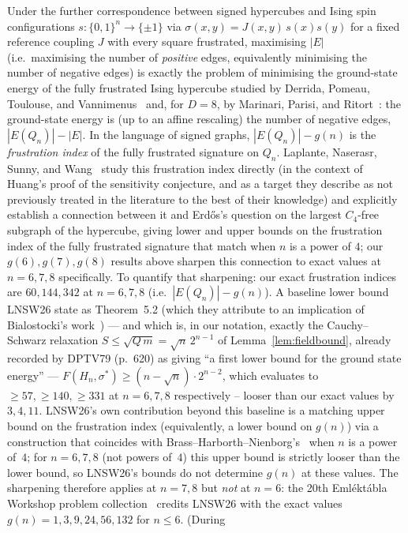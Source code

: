 \documentclass[12pt,a4paper]{article}
\theoremstyle{definition}
\begin{document}
Under the further correspondence between signed
hypercubes and Ising spin configurations $s:\{0,1\}^n\to\{\pm1\}$ via
$\sigma(x,y)=J(x,y)\,s(x)s(y)$ for a fixed reference coupling $J$ with every
square frustrated, maximising $|E|$ (i.e.\ maximising the number of
\emph{positive} edges, equivalently minimising the number of negative
edges) is exactly the problem of minimising the ground-state energy of the
fully frustrated Ising hypercube studied by Derrida, Pomeau, Toulouse, and
Vannimenus~\cite{DPTV79} and, for $D=8$, by Marinari, Parisi, and
Ritort~\cite{MPR95}: the ground-state energy is (up to an affine rescaling)
the number of negative edges, $|E(Q_n)|-|E|$. In the language of signed
graphs, $|E(Q_n)|-g(n)$ is the \emph{frustration index} of the fully
frustrated signature on $Q_n$. Laplante, Naserasr, Sunny, and
Wang~\cite{LNSW26} study this frustration index directly (in the
context of Huang's proof of the sensitivity conjecture, and as a target they
describe as not previously treated in the literature to the best of their
knowledge) and explicitly
establish a connection between it and Erd\H{o}s's question on the
largest $C_4$-free subgraph of the hypercube, giving lower and upper
bounds on the frustration index of the fully frustrated signature that
match when $n$ is a power of $4$; our $g(6),g(7),g(8)$ results above
sharpen this connection to exact values at $n=6,7,8$ specifically. To
quantify that sharpening: our exact frustration indices are $60,144,342$
at $n=6,7,8$ (i.e.\ $|E(Q_n)|-g(n)$). A baseline lower bound LNSW26
state as Theorem~5.2 (which they attribute to an implication of Bialostocki's
work~\cite{Bia83}) --- and which is, in our notation, exactly the Cauchy--Schwarz relaxation
$S\le\sqrt{Q\,m}=\sqrt n\,2^{n-1}$ of Lemma~\ref{lem:fieldbound}, already
recorded by DPTV79 (p.~620) as giving ``a first lower bound for the ground
state energy'' ---
$F(H_n,\sigma^*)\ge(n-\sqrt n)\cdot2^{n-2}$, which evaluates to
$\ge57,\ge140,\ge331$ at $n=6,7,8$ respectively -- looser than our exact
values by $3,4,11$. LNSW26's own contribution beyond this baseline is
a matching upper bound on the frustration index (equivalently, a lower
bound on $g(n)$) via a construction that coincides with
Brass--Harborth--Nienborg's~\cite{BHN95} when $n$ is a power of~$4$;
for $n=6,7,8$ (not powers of~$4$) this upper bound is
strictly looser than the lower bound, so LNSW26's bounds
do not determine $g(n)$ at these values. The sharpening therefore applies at $n=7,8$ but \emph{not} at $n=6$:
the 20th Emléktábla Workshop problem collection~\cite{Emlek26} credits
LNSW26 with the exact values $g(n)=1,3,9,24,56,132$ for $n\le6$. (During
\end{document}
